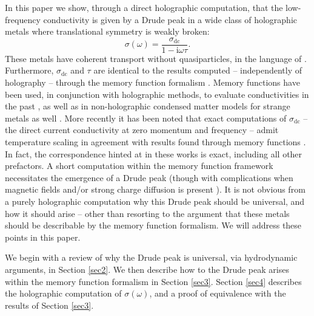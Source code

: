 \documentclass[10pt, oneside]{book}
\begin{document}
\begin{doublespace}
In this paper we show, through a direct holographic computation, that the low-frequency conductivity  is given by a Drude peak in a wide class of holographic metals where translational symmetry is weakly broken: \begin{equation}
\sigma(\omega) =  \frac{\sigma_{\mathrm{dc}}}{1-\mathrm{i}\omega \tau}. \label{drude}
\end{equation}These metals have coherent transport without quasiparticles, in the language of \cite{Hartnoll:2014lpa}.  Furthermore, $\sigma_{\mathrm{dc}}$ and $\tau$ are identical to the results computed -- independently of holography -- through the memory function formalism \cite{zwanzig, mori, forster1995}.  Memory functions have been used, in conjunction with holographic methods, to evaluate conductivities in the past \cite{Hartnoll:2012rj, Hartnoll:2008hs}, as well as in non-holographic condensed matter models for strange metals as well \cite{rosch2007, hkms, Hartnoll:2014gba, Patel:2014jfa}.    More recently it has been noted that exact computations of $\sigma_{\mathrm{dc}}$ -- the direct current conductivity at zero momentum and frequency -- admit temperature scaling in agreement with results found through memory functions \cite{Blake:2013owa, lucas1401}.   In fact, the correspondence hinted at in these works is exact, including all other prefactors.     A short computation within the memory function framework necessitates the emergence of a Drude peak (though with complications when magnetic fields and/or strong charge diffusion is present \cite{Lucas:2015pxa}).   It is not obvious from a purely holographic computation why this Drude peak should be universal, and how it should arise -- other than resorting to the argument that these metals should be describable by the memory function formalism.   We will address these points in this paper.

We begin with a review of why the Drude peak is universal, via hydrodynamic arguments, in Section \ref{sec2}.  We then describe how to the Drude peak arises within the memory function formalism in Section \ref{sec3}.   Section \ref{sec4} describes the holographic computation of $\sigma(\omega)$, and a proof of equivalence with the results of Section \ref{sec3}.


\end{doublespace}
\end{document}
